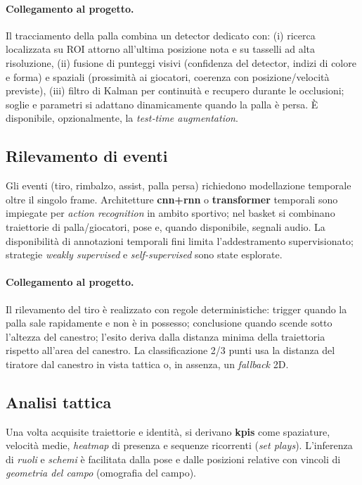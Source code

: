 \documentclass[12pt,a4paper,openright,twoside]{book}
\begin{document}
\paragraph{Collegamento al progetto.} Il tracciamento della palla combina un detector dedicato con: (i) ricerca localizzata
su ROI attorno all’ultima posizione nota e su tasselli ad alta risoluzione, (ii) fusione di punteggi visivi (confidenza
del detector, indizi di colore e forma) e spaziali (prossimità ai giocatori, coerenza con posizione/velocità previste),
(iii) filtro di Kalman per continuità e recupero durante le occlusioni; soglie e parametri si adattano dinamicamente
quando la palla è persa. È disponibile, opzionalmente, la \emph{test‑time augmentation}.


\subsection{Rilevamento di eventi}
Gli eventi (tiro, rimbalzo, assist, palla persa) richiedono modellazione temporale oltre il singolo frame. 
Architetture \textbf{\ac{cnn}+\ac{rnn}} o \textbf{transformer} temporali sono impiegate per \emph{action recognition} in ambito
sportivo; nel basket si combinano traiettorie di palla/giocatori, pose e, quando disponibile, segnali audio.
La disponibilità di annotazioni temporali fini limita l'addestramento supervisionato; strategie \emph{weakly supervised}
e \emph{self-supervised} sono state esplorate.

\paragraph{Collegamento al progetto.} Il rilevamento del tiro è realizzato con regole deterministiche: trigger quando la palla
sale rapidamente e non è in possesso; conclusione quando scende sotto l’altezza del canestro; l’esito deriva dalla distanza
minima della traiettoria rispetto all’area del canestro. La classificazione 2/3 punti usa la distanza del tiratore dal canestro
in vista tattica o, in assenza, un \emph{fallback} 2D.


\subsection{Analisi tattica}
Una volta acquisite traiettorie e identità, si derivano \textbf{\ac{kpis}} come 
spaziature, velocità medie, \emph{heatmap} di presenza e sequenze ricorrenti (\emph{set plays}). L'inferenza di 
\emph{ruoli} e \emph{schemi} è facilitata dalla pose e dalle posizioni relative con vincoli di \emph{geometria del campo}
(omografia del campo).
\end{document}
